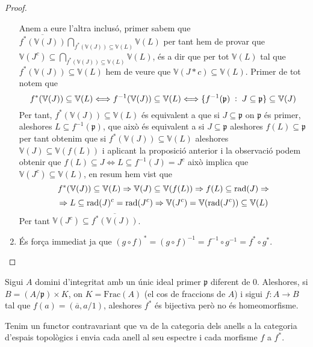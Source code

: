 \documentclass[../../../main.tex]{subfiles}
\begin{document}
\begin{proof}
\begin{enumerate}
    Anem a eure l'altra inclusó, primer sabem que $\overline{f^*(\mathbb{V}(J))}\bigcap_{f^*(\mathbb{V}(J))\subseteq\mathbb{V}(L)}\mathbb{V}(L)$ per tant hem de provar que $\mathbb{V}(J^c)\subseteq \bigcap_{f^*(\mathbb{V}(J))\subseteq\mathbb{V}(L)}\mathbb{V}(L)$, és a dir que per tot $\mathbb{V}(L)$ tal que $f^*(\mathbb{V}(J))\subseteq \mathbb{V}(L)$ hem de veure que $\mathbb{V}(J*c)\subseteq\mathbb{V}(L)$. Primer de tot notem que 
    \begin{equation}
        \notag
        f^*(\mathbb{V}(J))\subseteq \mathbb{V}(L)\Longleftrightarrow f^{-1}(\mathbb{V}(J))\subseteq \mathbb{V}(L)\Longleftrightarrow \{f^{-1}(\mathfrak{p})\;:\;J\subseteq \mathfrak{p}\}\subseteq\mathbb{V}(J)
    \end{equation}
    Per tant, $f^*(\mathbb{V}(J))\subseteq\mathbb{V}(L)$ és equivalent a que si $J\subseteq \mathfrak{p}$ on $\mathfrak{p}$ és primer, aleshores $L\subseteq f^{-1}(\mathfrak{p})$, que això és equivalent a si $J\subseteq\mathfrak{p}$ aleshores $f(L)\subseteq\mathfrak{p}$ per tant obtenim que si $f^*(\mathbb{V}(J))\subseteq \mathbb{V}(L)$ aleshores $\mathbb{V}(J)\subseteq \mathbb{V}(f(L))$ i aplicant la proposició anterior i la observació podem obtenir que $f(L)\subseteq J\Longleftrightarrow L\subseteq f^{-1}(J) = J^c$ això implica que $\mathbb{V}(J^c)\subseteq\mathbb{V}(L)$, en resum hem vist que
    \begin{equation}
        \notag
        f^*(\mathbb{V}(J))\subseteq \mathbb{V}(L)\Rightarrow \mathbb{V}(J)\subseteq \mathbb{V}(f(L))\Rightarrow f(L)\subseteq\operatorname{\mathrm{rad}}(J)\Rightarrow
    \end{equation}
    \begin{equation}
        \notag
        \Rightarrow L\subseteq \operatorname{\mathrm{rad}}(J)^c = \operatorname{\mathrm{rad}}(J^c)\Rightarrow \mathbb{V}(J^c) = \mathbb{V}(\operatorname{\mathrm{rad}}(J^c))\subseteq\mathbb{V}(L)
    \end{equation}
    Per tant $\mathbb{V}(J^c)\subseteq\overline{f^*(\mathbb{V}(J))}$.
    
    \item És força immediat ja que $(g\circ f)^* = (g\circ f)^{-1} = f^{-1}\circ g^{-1} = f^*\circ g^*$.
\end{enumerate}
\end{proof}

\begin{nota}
Sigui $A$ domini d'integritat amb un únic ideal primer $\mathfrak{p}$ diferent de $0$. Aleshores, si $B = (A/\mathfrak{p})\times K$, on $K = \mathrm{Frac}(A)$ (el cos de fraccions de $A$) i sigui $f:A\to B$ tal que $f(a) = (\overline{a},a/1)$, aleshores $f^*$ és bijectiva però no és homeomorfisme.
\end{nota}

\begin{nota}
Tenim un functor contravariant que va de la categoria dels anells a la categoria d'espais topològics i envia cada anell al seu espectre i cada morfisme $f$ a $f^*$.
\end{nota}
\end{document}
